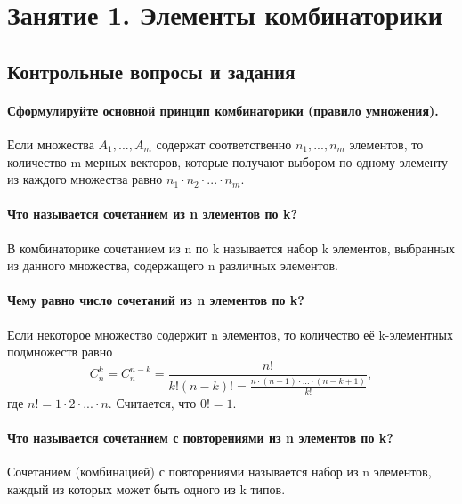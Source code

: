 \documentclass{book}
\begin{document}
\tableofcontents

\chapter*{Занятие 1. Элементы комбинаторики}

\section*{Контрольные вопросы и задания}

\subsubsection*{Сформулируйте основной принцип комбинаторики (правило умножения).}

Если множества $A_1, ..., A_m$ содержат соответственно $n_1, ..., n_m$ элементов, то количество m-мерных векторов, которые получают выбором по одному элементу из каждого множества равно $n_1\cdot n_2\cdot...\cdot n_m$.

\subsubsection*{Что называется сочетанием из n элементов по k?}

В комбинаторике сочетанием из n по k называется набор k элементов, выбранных из данного множества, содержащего n различных элементов.

\subsubsection*{Чему равно число сочетаний из n элементов по k?}

Если некоторое множество содержит n элементов, то количество её k-элементных подмножеств равно $$C_n^k=C_n^{n-k}=\frac{n!}{k!\left(n-k\right)!=\frac{n\cdot\left(n-1\right)\cdot...\cdot\left(n-k+1\right)}{k!}},$$ где $n!=1\cdot 2\cdot...\cdot n$. Считается, что $0!=1$.

\subsubsection*{Что называется сочетанием с повторениями из n элементов по k?}

Сочетанием (комбинацией) с повторениями называется набор из n элементов, каждый из которых может быть одного из k типов.
\end{document}
